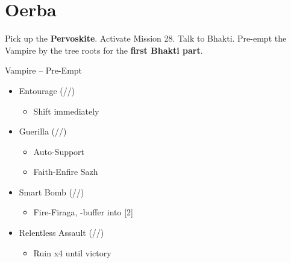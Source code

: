 \chapter{Oerba}

\renewcommand{\first}{[1] Guerilla (\syn/\rav/\sab)}
\renewcommand{\second}{[2] Relentless Assault (\com/\rav/\rav)}
\renewcommand{\third}{[3] Entourage (\rav/\sen/\med)}
\renewcommand{\fourth}{[4] Solidarity (\com/\sen/\med)}
\renewcommand{\fifth}{[5] Smart Bomb (\rav/\rav/\sab)}
\renewcommand{\sixth}{[6] Diversity (\com/\rav/\med)}

Pick up the \textbf{Pervoskite}.
Activate Mission 28.
Talk to Bhakti.
Pre-empt the Vampire by the tree roots for the \textbf{first Bhakti part}.

\begin{battle}{Vampire -- Pre-Empt}
	\begin{itemize}
		\item \third
			\begin{itemize}
				\item Shift immediately
			\end{itemize}
		\item \first
			\begin{itemize}
				\item Auto-Support
				\item Faith-Enfire Sazh
			\end{itemize}
		\item \fifth
			\begin{itemize}
				\item Fire-Firaga, \com-buffer into [2]
			\end{itemize}
		\item \second
			\begin{itemize}
				\item Ruin x4 until victory
			\end{itemize}
	\end{itemize}
\end{battle}


